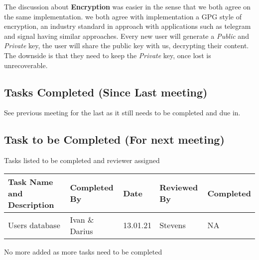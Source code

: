 \documentclass{article}
\begin{document}
The discussion about \textbf{Encryption} was easier in the sense that we both agree on the same implementation. we both agree with implementation a GPG style of encryption, an industry standard in approach with applications such as telegram and signal having similar approaches. Every new user will generate a \textit{Public} and \textit{Private} key, the user will share the public key with us, decrypting their content. The downside is that they need to keep the \textit{Private} key, once lost is unrecoverable.    

\subsection{Tasks Completed (Since Last meeting)}
See previous meeting for the last as it still needs to be completed and due in.
\subsection{Task to be Completed (For next meeting) }
Tasks listed to be completed and reviewer assigned
\begin{center}
    \begin{tabular}{|p{9cm}|l|l|l|l|}
    \hline
    Task Name and Description & Completed By & Date & Reviewed By & Completed \\ \hline
	    Users database &Ivan \& Darius & 13.01.21&Stevens& NA           \\ \hline
    \end{tabular}
    \end{center}
No more added as more tasks need to be completed
\end{document}
